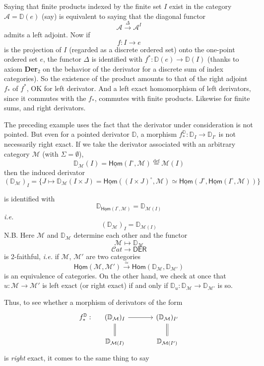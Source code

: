 \documentclass[11pt]{article}
\newcommand{\printedpage}[1]{\marginpar{\footnotesize p.~#1}}
\newcommand{\msp}[1]{\marginpar{\footnotesize [#1]}}
\newcommand{\D}{\mathbb{D}}
\newcommand{\uHom}{\underline{\mathsf{Hom}}}
\newcommand{\sHom}{\mathsf{Hom}}
\newcommand{\DER}{\mathsf{DER}}
\newcommand{\Cat}{\mathcal{C}at}
\begin{document}
\printedpage{18}

\msp{page 26}

Saying that finite products indexed by the finite set $I$ exist in the category $\mathcal{A} = \D(e)$ (say) is equivalent to saying that the diagonal functor
\[
\mathcal{A} \xrightarrow{\Delta} \mathcal{A}^I
\]
admits a left adjoint. Now if
\[
f : I \to e
\]
is the projection of $I$ (regarded as a discrete ordered set) onto the one-point ordered set $e$, the functor $\Delta$ is identified with $f^* : \D(e) \to \D(I)$ (thanks to axiom \textbf{Der}$_2$ on the behavior of the derivator for a discrete sum of index categories). So the existence of the product amounts to that of the right adjoint $f_*$ of $f^*$, OK for left derivator. And a left exact homomorphism of left derivators, since it commutes with the $f_*$, commutes with finite products. Likewise for finite sums, and right derivators.

The preceding example uses the fact that the derivator under consideration is not pointed. But even for a pointed derivator $\D$, a morphism $f^{\D}_* : \D_I \to \D_{I'}$ is not necessarily right exact. If we take the derivator associated with an arbitrary category $\mathcal{M}$ (with $\Sigma = \emptyset$),
\[
\D_{\mathcal{M}}(I) = \uHom(I^\circ,\mathcal{M}) \overset{\text{def}}{=} \mathcal{M}(I)
\]
then the induced derivator
\[
(\D_{\mathcal{M}})_I = \{J \mapsto \D_{\mathcal{M}}(I \times J) = \uHom((I \times J)^\circ,\mathcal{M}) \simeq \uHom(J^\circ,\uHom(I^\circ,\mathcal{M}))\}
\]

\msp{page 27}

is identified with
\[
\D_{\uHom(I^\circ,\mathcal{M})} = \D_{\mathcal{M}(I)}
\]
\textit{i.e.}
\[
(\D_{\mathcal{M}})_I = \D_{\mathcal{M}(I)}
\]
N.B. Here $\mathcal{M}$ and $\D_{\mathcal{M}}$ determine each other and the functor
\[
\mathcal{M} \longmapsto \D_{\mathcal{M}}
\]
\[
\Cat \longrightarrow \DER
\]
is 2-faithful, \textit{i.e.} if $\mathcal{M}$, $\mathcal{M}'$ are two categories
\[
\uHom(\mathcal{M},\mathcal{M}') \xrightarrow{\simeq} \sHom(\D_{\mathcal{M}},\D_{\mathcal{M}'})
\]
is an equivalence of categories. On the other hand, we check at once that $u : \mathcal{M} \to \mathcal{M}'$ is left exact (or right exact) if and only if $\D_u : \D_{\mathcal{M}} \to \D_{\mathcal{M}'}$ is so.

Thus, to see whether a morphism of derivators of the form
\[
\begin{tikzcd}[column sep=large, row sep=normal]
f^{\D}_* : &[-2.5em] (\D_{\mathcal{M}})_I \arrow[r] \arrow[d, equal] & (\D_{\mathcal{M}})_{I'} \arrow[d, equal] \\
& \D_{\mathcal{M}(I)} & \D_{\mathcal{M}(I')}
\end{tikzcd}
\]
is \textit{right} exact, it comes to the same thing to say
\end{document}
